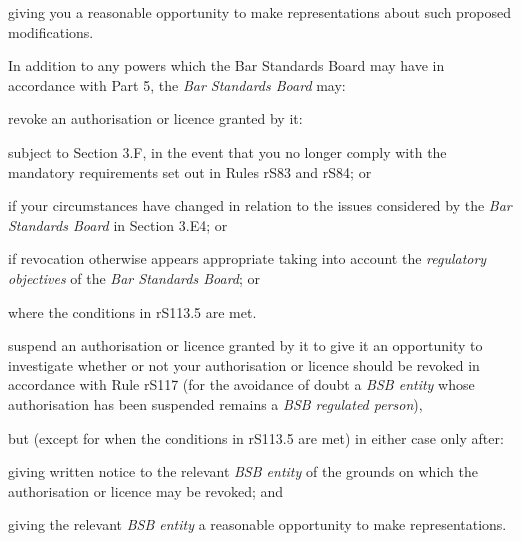 \item giving you a reasonable opportunity to make representations about
such proposed modifications.\la
\ln
{}



In addition to any powers which the Bar Standards Board may have in
accordance with Part 5, the \emph{Bar Standards Board} may:\nl\item revoke an authorisation or licence granted by it:
\al
\item subject to Section 3.F, in the event that you no longer comply with
the mandatory requirements set out in Rules rS83 and rS84; or

\item if your circumstances have changed in relation to the issues
considered by the \emph{Bar Standards Board} in Section 3.E4; or

\item if revocation otherwise appears appropriate taking into account the
\emph{regulatory objectives} of the \emph{Bar Standards Board}; or

\item where the conditions in rS113.5 are met.\la
\item suspend an authorisation or licence granted by it to give it an
opportunity to investigate whether or not your authorisation or licence
should be revoked in accordance with Rule rS117 (for the avoidance of
doubt a \emph{BSB entity} whose authorisation has been suspended remains
a \emph{BSB regulated person}),

but (except for when the conditions in rS113.5 are met) in either case
only after:

\rl \item  giving written notice to the relevant \emph{BSB entity} of the
grounds on which the authorisation or licence may be revoked; and

\item giving the relevant \emph{BSB entity} a reasonable opportunity to
make representations.\lr
\ln
{}




